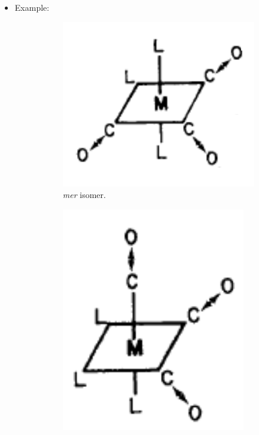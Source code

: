 \documentclass[../notes.tex]{subfiles}
\begin{document}
\begin{itemize}
    \item Example:
    \begin{figure}[h!]
        \centering
        \begin{subfigure}[b]{0.2\linewidth}
            \centering
            \includegraphics[width=0.8\linewidth]{../ExtFiles/ML3CO3a.png}
            \caption{\emph{mer} isomer.}
            \label{fig:ML3CO3a}
        \end{subfigure}
        \begin{subfigure}[b]{0.2\linewidth}
            \centering
            \includegraphics[width=0.8\linewidth]{../ExtFiles/ML3CO3b.png}

\end{subfigure}
\end{figure}
\end{itemize}
\end{document}
